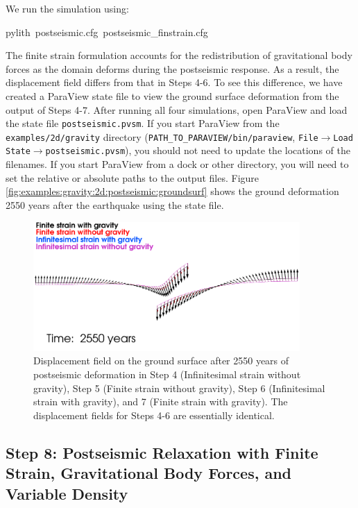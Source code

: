 We run the simulation using:
\begin{lyxcode}
pylith~postseismic.cfg~postseismic\_finstrain.cfg
\end{lyxcode}
The finite strain formulation accounts for the redistribution of gravitational
body forces as the domain deforms during the postseismic response.
As a result, the displacement field differs from that in Steps 4-6.
To see this difference, we have created a ParaView state file to view
the ground surface deformation from the output of Steps 4-7. After
running all four simulations, open ParaView and load the state file
\texttt{postseismic.pvsm}. If you start ParaView from the \texttt{examples/2d/gravity}
directory (\texttt{PATH\_TO\_PARAVIEW/bin/paraview}, \texttt{File$\rightarrow$Load
State$\rightarrow$postseismic.pvsm}), you should not need to update
the locations of the filenames. If you start ParaView from a dock
or other directory, you will need to set the relative or absolute
paths to the output files. Figure \vref{fig:examples:gravity:2d:postseismic:groundsurf}
shows the ground deformation 2550 years after the earthquake using
the state file.

\begin{figure}
\begin{centering}
\includegraphics[width=4in]{tutorials/grav2d/figs/postseismic_dispcmp}
\par\end{centering}

\caption{Displacement field on the ground surface after 2550 years of postseismic
deformation in Step 4 (Infinitesimal strain without gravity), Step
5 (Finite strain without gravity), Step 6 (Infinitesimal strain with
gravity), and 7 (Finite strain with gravity). The displacement fields
for Steps 4-6 are essentially identical. \label{fig:examples:gravity:2d:postseismic:groundsurf}}
\end{figure}



\subsection{Step 8: Postseismic Relaxation with Finite Strain, Gravitational
Body Forces, and Variable Density}

